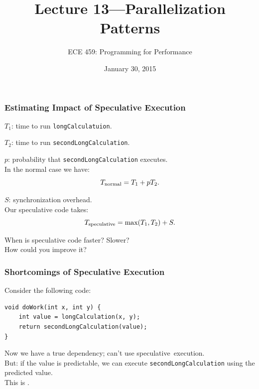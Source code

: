\documentclass[aspectratio=43]{beamer}
\title{Lecture 13---Parallelization Patterns}
\subtitle{ECE 459: Programming for Performance}
\date{January 30, 2015}
\newenvironment{changemargin}[1]{%
  \begin{list}{}{%
    \setlength{\topsep}{0pt}%
    \setlength{\leftmargin}{#1}%
    \setlength{\rightmargin}{1em}
    \setlength{\listparindent}{\parindent}%
    \setlength{\itemindent}{\parindent}%
    \setlength{\parsep}{\parskip}%
  }%
  \item[]}{\end{list}}
\begin{document}
\begin{frame}[plain]
  \titlepage
\end{frame}

\begin{frame}
  \frametitle{Estimating Impact of Speculative Execution}

  \begin{changemargin}{2.5cm}
  $T_1$: time to run {\tt longCalculatuion}.

  $T_2$: time to run {\tt secondLongCalculation}.

  $p$: probability that {\tt secondLongCalculation} executes.\\[1em]

  In the normal case we have:
    \[T_{\mbox{\scriptsize normal}} = T_1 + pT_2.\]

  $S$: synchronization overhead.\\
  Our speculative code takes:
    \[ T_{\mbox{\scriptsize speculative}} = \mbox{max}(T_1, T_2) + S.\]

     When is speculative code faster? Slower? \\ How could you improve it?

  \end{changemargin}
\end{frame}

\begin{frame}[fragile]
  \frametitle{Shortcomings of Speculative Execution}

  \begin{changemargin}{2cm}
  Consider the following code:
  
  \begin{lstlisting}
void doWork(int x, int y) {
    int value = longCalculation(x, y);
    return secondLongCalculation(value);
}
  \end{lstlisting}

  Now we have a true dependency; can't use speculative~execution.\\[1em]

  But: if the value is predictable, we can execute
      {\tt secondLongCalculation} using the predicted value.\\[1em]

  This is .
  \end{changemargin}
\end{frame}
\end{document}
